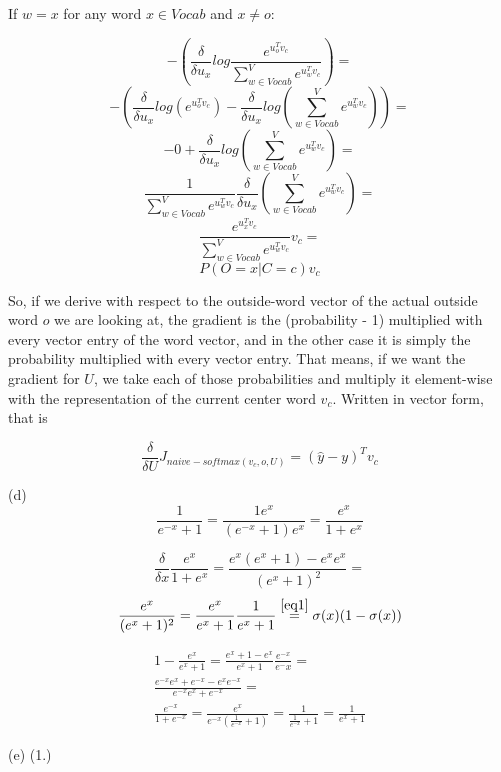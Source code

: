 \documentclass{article}
\begin{document}
If $w = x$ for any word $x \in Vocab$ and $x \neq o:$

$$-(\frac{\delta}{\delta u_x}log \frac{e^{u_o^Tv_c}}{\sum_{w\in Vocab}^{V}e^{u_w^Tv_c}}) =$$
$$-(\frac{\delta}{\delta u_x}log (e^{u_o^Tv_c}) - \frac{\delta}{\delta u_x}log(\sum_{w\in Vocab}^{V}e^{u_w^Tv_c})) =$$
$$-0 +  \frac{\delta}{\delta u_x}log(\sum_{w\in Vocab}^{V}e^{u_w^Tv_c}) =$$
$$\frac{1}{\sum_{w\in Vocab}^{V}e^{u_w^Tv_c}}\frac{\delta}{\delta u_x}(\sum_{w\in Vocab}^{V}e^{u_w^Tv_c}) =$$
$$\frac{e^{u_x^Tv_c}}{\sum_{w\in Vocab}^{V}e^{u_w^Tv_c}}v_c =$$
$$P(O = x|C = c)v_c$$

So, if we derive with respect to the outside-word vector of the actual outside word $o$ we are looking at, the gradient is the (probability - 1) multiplied with every vector entry of the word vector, and in the other case it is simply the probability multiplied with every vector entry. That means, if we want the gradient for $U$, we take each of those probabilities and multiply it element-wise with the representation of the current center word $v_c$. Written in vector form, that is

$$\frac{\delta}{\delta U} J_{naive-softmax(v_c, o, U)}  = (\hat{y} - y)^T v_c$$


(d) $$\frac{1}{e^{-x} + 1} = \frac{1 e^x}{(e^{-x} + 1)e^x} = \frac{e^x}{1 + e^x}$$

$$\frac{\delta}{\delta x}  \frac{e^x}{1 + e^x} = \frac{e^x(e^x + 1) - e^x e^x}{(e^x + 1) ^ 2} = $$
$$\frac{e^x}{(e^x + 1) ^ 2} = \frac{e^x}{e^x + 1}\frac{1}{e^x+1} \overset{\mathrm{\ref{eq1}}}{=} \sigma(x)(1-\sigma(x))$$

\begin{equation}\label{eq1}
    \begin{aligned}
    1 - \frac{e^x}{e^x + 1} = \frac{e^x + 1 - e ^ x}{e^x + 1}\frac{e^{-x}}{e^-x} = \\
    \frac{e^{-x}e^x + e^{-x}-e^x e^{-x}}{e^{-x}e^x+e^{-x}} = \\
    \frac{e^{-x}}{1 + e^{-x}} = \frac{e^x}{e^{-x}(\frac{1}{e^{-x}} + 1)} = \frac{1}{\frac{1}{e^{-x}} + 1} = \frac{1}{e^x + 1}
    \end{aligned}
\end{equation}

(e) (1.)\newline
\end{document}
